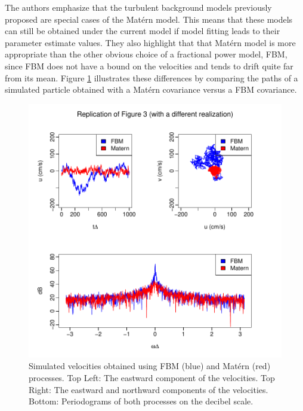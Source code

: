 \documentclass{stat572Style}
\begin{document}
The authors emphasize that the turbulent background models previously proposed are special cases of the Mat\'{e}rn model. 
This means that these models can still be obtained under the current model if model fitting leads to their parameter estimate values. 
They also highlight that that Mat\'{e}rn model is more appropriate than the other obvious choice of a fractional power model, FBM, since FBM does not have a bound on the velocities and tends to drift quite far from its mean.
 Figure \ref{fig: fmbMat} illustrates these differences by comparing the paths of a simulated particle obtained with a Mat\'{e}rn  covariance versus a FBM covariance. 

\begin{figure}[h!]
  \centering
    \includegraphics[width=.85\textwidth]{ReplicatedFigures/fig3.pdf}
        \caption{Simulated velocities obtained using FBM (blue) and Mat\'{e}rn (red)  processes. Top Left: The eastward component of the velocities. Top Right: The eastward and northward components of the velocities. Bottom: Periodograms of both processes on the decibel scale. }
        	\label{fig: fmbMat}
\end{figure}
\end{document}
